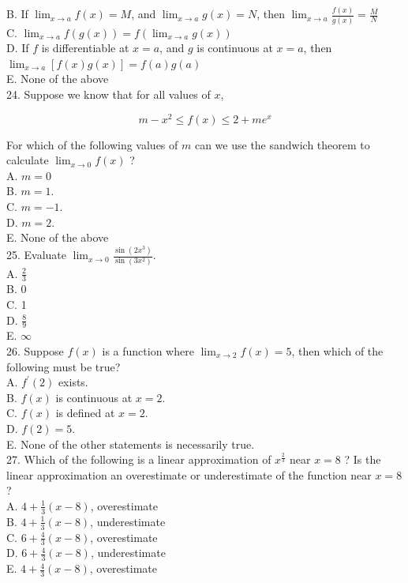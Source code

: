 B. If $\lim _{x \rightarrow a} f(x)=M$, and $\lim _{x \rightarrow a} g(x)=N$, then $\lim _{x \rightarrow a} \frac{f(x)}{g(x)}=\frac{M}{N}$\\
C. $\lim _{x \rightarrow a} f(g(x))=f\left(\lim _{x \rightarrow a} g(x)\right)$\\
D. If $f$ is differentiable at $x=a$, and $g$ is continuous at $x=a$, then $\lim _{x \rightarrow a}[f(x) g(x)]=f(a) g(a)$\\
E. None of the above\\
24. Suppose we know that for all values of $x$,

$$
m-x^{2} \leq f(x) \leq 2+m e^{x}
$$

For which of the following values of $m$ can we use the sandwich theorem to calculate $\lim _{x \rightarrow 0} f(x)$ ?\\
A. $m=0$\\
B. $m=1$.\\
C. $m=-1$.\\
D. $m=2$.\\
E. None of the above\\
25. Evaluate $\lim _{x \rightarrow 0} \frac{\sin \left(2 x^{3}\right)}{\sin \left(3 x^{2}\right)}$.\\
A. $\frac{2}{3}$\\
B. 0\\
C. 1\\
D. $\frac{8}{9}$\\
E. $\infty$\\
26. Suppose $f(x)$ is a function where $\lim _{x \rightarrow 2} f(x)=5$, then which of the following must be true?\\
A. $f^{\prime}(2)$ exists.\\
B. $f(x)$ is continuous at $x=2$.\\
C. $f(x)$ is defined at $x=2$.\\
D. $f(2)=5$.\\
E. None of the other statements is necessarily true.\\
27. Which of the following is a linear approximation of $x^{\frac{2}{3}}$ near $x=8$ ? Is the linear approximation an overestimate or underestimate of the function near $x=8$ ?\\
A. $4+\frac{1}{3}(x-8)$, overestimate\\
B. $4+\frac{1}{3}(x-8)$, underestimate\\
C. $6+\frac{4}{3}(x-8)$, overestimate\\
D. $6+\frac{4}{3}(x-8)$, underestimate\\
E. $4+\frac{4}{3}(x-8)$, overestimate

